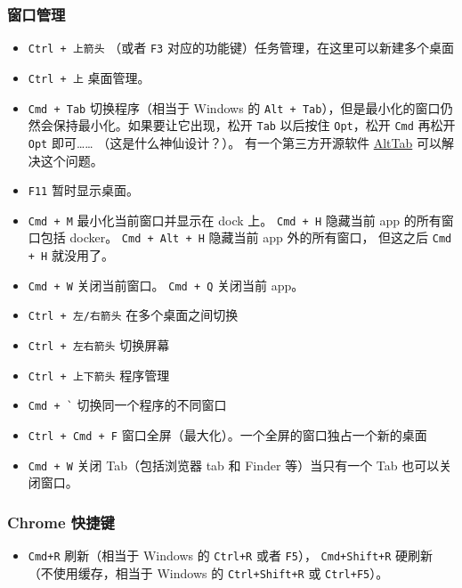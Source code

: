 \subsubsection{窗口管理}
\begin{itemize}
\item \verb`Ctrl + 上箭头` （或者 \verb`F3` 对应的功能键）任务管理，在这里可以新建多个桌面
\item \verb|Ctrl + 上| 桌面管理。
\item \verb|Cmd + Tab| 切换程序（相当于 Windows 的 \verb`Alt + Tab`），但是最小化的窗口仍然会保持最小化。如果要让它出现，松开 \verb`Tab` 以后按住 \verb`Opt`，松开 \verb`Cmd` 再松开 \verb`Opt` 即可…… （这是什么神仙设计？）。 有一个第三方开源软件 \href{https://alt-tab-macos.netlify.app/}{AltTab} 可以解决这个问题。
\item \verb|F11| 暂时显示桌面。
\item \verb|Cmd + M| 最小化当前窗口并显示在 dock 上。 \verb`Cmd + H` 隐藏当前 app 的所有窗口包括 docker。 \verb`Cmd + Alt + H` 隐藏当前 app 外的所有窗口， 但这之后 \verb`Cmd + H` 就没用了。
\item \verb|Cmd + W| 关闭当前窗口。 \verb|Cmd + Q| 关闭当前 app。
\item \verb`Ctrl + 左/右箭头` 在多个桌面之间切换
\item \verb|Ctrl + 左右箭头| 切换屏幕
\item \verb|Ctrl + 上下箭头| 程序管理
\item \verb|Cmd + `| 切换同一个程序的不同窗口
\item \verb`Ctrl + Cmd + F` 窗口全屏（最大化）。一个全屏的窗口独占一个新的桌面
\item \verb`Cmd + W` 关闭 Tab（包括浏览器 tab 和 Finder 等）当只有一个 Tab 也可以关闭窗口。
\end{itemize}

\subsubsection{Chrome 快捷键}
\begin{itemize}
\item \verb|Cmd+R| 刷新（相当于 Windows 的 \verb|Ctrl+R| 或者 \verb|F5|）， \verb|Cmd+Shift+R| 硬刷新（不使用缓存，相当于 Windows 的 \verb|Ctrl+Shift+R| 或 \verb|Ctrl+F5|）。
\end{itemize}

